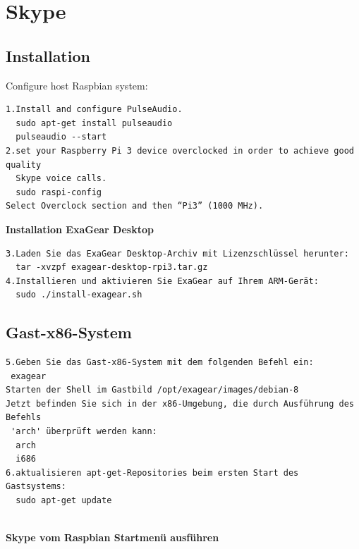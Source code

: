\section{Skype}

\subsection{Installation}
Configure host Raspbian system:
\begin{verbatim}
1.Install and configure PulseAudio.
  sudo apt-get install pulseaudio
  pulseaudio --start
2.set your Raspberry Pi 3 device overclocked in order to achieve good quality
  Skype voice calls. 
  sudo raspi-config
Select Overclock section and then “Pi3” (1000 MHz).
\end{verbatim}

\textbf{Installation ExaGear Desktop}
\begin{verbatim}
3.Laden Sie das ExaGear Desktop-Archiv mit Lizenzschlüssel herunter:
  tar -xvzpf exagear-desktop-rpi3.tar.gz
4.Installieren und aktivieren Sie ExaGear auf Ihrem ARM-Gerät:
  sudo ./install-exagear.sh	 
\end{verbatim}
\subsection{Gast-x86-System}
\begin{verbatim}
5.Geben Sie das Gast-x86-System mit dem folgenden Befehl ein:
 exagear
Starten der Shell im Gastbild /opt/exagear/images/debian-8
Jetzt befinden Sie sich in der x86-Umgebung, die durch Ausführung des Befehls
 'arch' überprüft werden kann:
  arch
  i686
6.aktualisieren apt-get-Repositories beim ersten Start des Gastsystems:
  sudo apt-get update
\end{verbatim}\\

\textbf{Skype vom Raspbian Startmenü ausführen} \\

